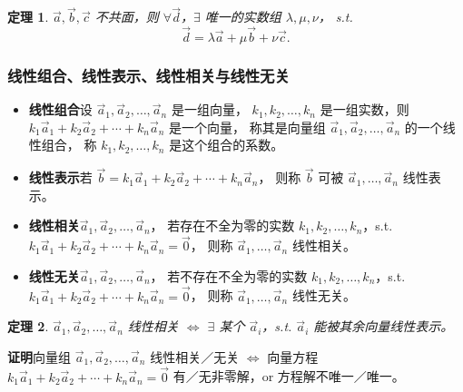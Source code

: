 \documentclass[UTF8,11pt]{ctexart}
\theoremstyle{cnthm}
\newtheorem{thm}{定理}[section]
\begin{document}
\begin{thm}
$\vec a,\vec b,\vec c$ 不共面，则
$\forall\vec d$，$\exists$ 唯一的实数组 $\lambda,\mu,\nu$，
s.t.
\[
\vec d=\lambda\vec a+\mu\vec b+\nu\vec c .
\]
\end{thm}

\subsubsection*{线性组合、线性表示、线性相关与线性无关}

\begin{itemize}
\item \textbf{线性组合}\quad 设
$\vec a_1,\vec a_2,\ldots,\vec a_n$ 是一组向量，
$k_1,k_2,\ldots,k_n$ 是一组实数，则
$k_1\vec a_1+k_2\vec a_2+\cdots+k_n\vec a_n$ 是一个向量，
称其是向量组 $\vec a_1,\vec a_2,\ldots,\vec a_n$ 的一个线性组合，
称 $k_1,k_2,\ldots,k_n$ 是这个组合的系数。
\item \textbf{线性表示}\quad 若
$\vec b=k_1\vec a_1+k_2\vec a_2+\cdots+k_n\vec a_n$，
则称 $\vec b$ 可被 $\vec a_1,\ldots,\vec a_n$ 线性表示。
\item \textbf{线性相关}\quad $\vec a_1,\vec a_2,\ldots,\vec a_n$，
若存在不全为零的实数 $k_1,k_2,\ldots,k_n$，s.t.
$k_1\vec a_1+k_2\vec a_2+\cdots+k_n\vec a_n=\vec 0$，
则称 $\vec a_1,\ldots,\vec a_n$ 线性相关。
\item \textbf{线性无关}\quad $\vec a_1,\vec a_2,\ldots,\vec a_n$，
若不存在不全为零的实数 $k_1,k_2,\ldots,k_n$，s.t.
$k_1\vec a_1+k_2\vec a_2+\cdots+k_n\vec a_n=\vec 0$，
则称 $\vec a_1,\ldots,\vec a_n$ 线性无关。
\end{itemize}

\begin{thm}
$\vec a_1,\vec a_2,\ldots,\vec a_n$ 线性相关
$\Longleftrightarrow$ $\exists$ 某个 $\vec a_i$，s.t.
$\vec a_i$ 能被其余向量线性表示。
\end{thm}

\textbf{证明}\quad 向量组
$\vec a_1,\vec a_2,\ldots,\vec a_n$ 线性相关／无关
$\Longleftrightarrow$ 向量方程
$k_1\vec a_1+k_2\vec a_2+\cdots+k_n\vec a_n=\vec 0$
有／无非零解，or 方程解不唯一／唯一。
\end{document}
